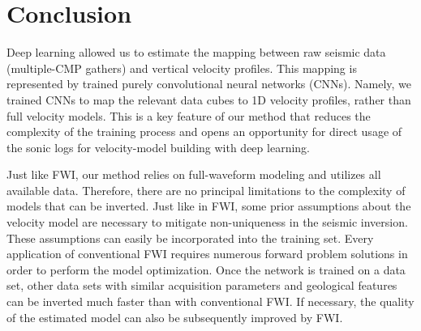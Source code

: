 \documentclass[paper,twocolomn]{geophysics}
\begin{document}
\section{Conclusion}

Deep learning allowed us to estimate the mapping between raw seismic data (multiple-CMP gathers) and vertical velocity profiles. This mapping is represented by trained purely convolutional neural networks (CNNs). Namely, we trained CNNs to map the relevant data cubes to 1D velocity profiles, rather than full velocity models. This is a key feature of our method that reduces the complexity of the training process and opens an opportunity for direct usage of the sonic logs for velocity-model building with deep learning.
 
Just like FWI, our method relies on full-waveform modeling and utilizes all available data. Therefore, there are no principal limitations to the complexity of models that can be inverted. Just like in FWI, some prior assumptions about the velocity model are necessary to mitigate non-uniqueness in the seismic inversion. These assumptions can easily be incorporated into the training set. Every application of conventional FWI requires numerous forward problem solutions in order to perform the model optimization. Once the network is trained on a data set, other data sets with similar acquisition parameters and geological features can be inverted much faster than with conventional FWI. If necessary, the quality of the estimated model can also be subsequently improved by FWI.









 




%
\end{document}
